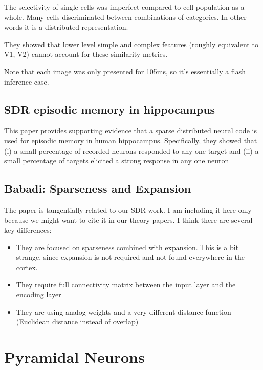 \documentclass{article} %
\begin{document}
The selectivity of single cells was imperfect compared to cell population as a
whole. Many cells discriminated between combinations of categories. In other
words it is a distributed representation.

They showed that lower level simple and complex features (roughly equivalent to
V1, V2) cannot account for these similarity metrics.

Note that each image was only presented for 105ms, so it's essentially a flash
inference case.

\subsection{SDR episodic memory in hippocampus}
This paper \cite{Wixted2014} provides supporting evidence that a sparse distributed neural code 
is used for episodic memory in human hippocampus. Specifically, they showed that  (i) a small 
percentage of recorded neurons responded to any one target and (ii) a small percentage of targets 
elicited a strong response in any one neuron

\subsection{Babadi: Sparseness and Expansion}


The paper \cite{Babadi2014} is tangentially related to our SDR work. I am
including it here only because we might want to cite it in our
theory papers. I think there are several key differences:

\begin{itemize}
\item They are focused on sparseness combined with expansion. This is a bit
strange, since expansion is not required and not found everywhere in the cortex.

\item They require full connectivity matrix between the input layer and the
encoding layer

\item They are using analog weights and a very different distance function
(Euclidean distance instead of overlap)

\end{itemize}

\section{Pyramidal Neurons}
\end{document}
